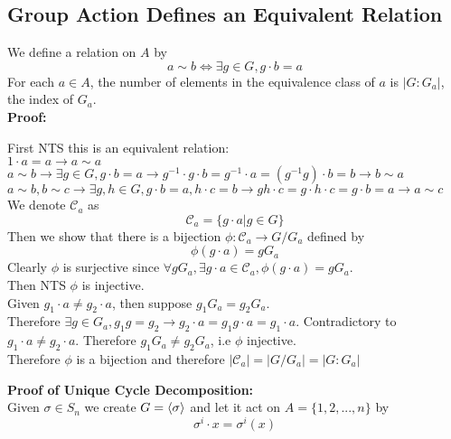 \documentclass{article}
\begin{document}
\subsection{Group Action Defines an Equivalent Relation}
We define a relation on $A$ by
\begin{equation*}
    a \sim b \iff \exists g \in G, g\cdot b = a
\end{equation*}
For each $a \in A$, the number of elements in the equivalence class of $a$ is $|G:G_a|$, the index of $G_a$.\\
\textbf{Proof:}
\begin{addmargin}[1em]{0em}
First NTS this is an equivalent relation:\\
$1\cdot a = a \rightarrow a \sim a$\\
$a \sim b \rightarrow \exists g \in G, g\cdot b = a \rightarrow g^{-1}\cdot g\cdot b = g^{-1}\cdot a = (g^{-1}g)\cdot b = b \rightarrow b \sim a$\\
$a \sim b, b \sim c \rightarrow \exists g, h \in G, g \cdot b = a, h \cdot c = b \rightarrow gh \cdot c = g\cdot h \cdot c = g\cdot b = a \rightarrow a \sim c$\\
We denote $\mathcal{C}_a$ as
\begin{equation*}
    \mathcal{C}_a = \{g\cdot a| g \in G\}
\end{equation*}
Then we show that there is a bijection $\phi:\mathcal{C}_a \rightarrow G/G_a$ defined by
\begin{equation*}
    \phi(g \cdot a) = gG_a
\end{equation*}
Clearly $\phi$ is surjective since $\forall gG_a, \exists g\cdot a \in \mathcal{C}_a, \phi(g\cdot a) = gG_a$.\\
Then NTS $\phi$ is injective.\\
Given $g_1\cdot a \neq g_2\cdot a$, then suppose $g_1G_a = g_2G_a$.\\
Therefore $\exists g \in G_a, g_1g = g_2 \rightarrow g_2\cdot a = g_1g \cdot a = g_1\cdot a$. Contradictory to $g_1\cdot a \neq g_2\cdot a$. Therefore $g_1G_a \neq g_2G_a$, i.e $\phi$ injective.\\
Therefore $\phi$ is a bijection and therefore $|\mathcal{C}_a| = |G/G_a| = |G:G_a|$
\end{addmargin}
\textbf{Proof of Unique Cycle Decomposition:}\\
Given $\sigma \in S_n$ we create $G = \braket{\sigma}$ and let it act on $A = \{1, 2, ..., n\}$ by
\begin{equation*}
    \sigma^i \cdot x = \sigma^i(x)
\end{equation*}
\end{document}
